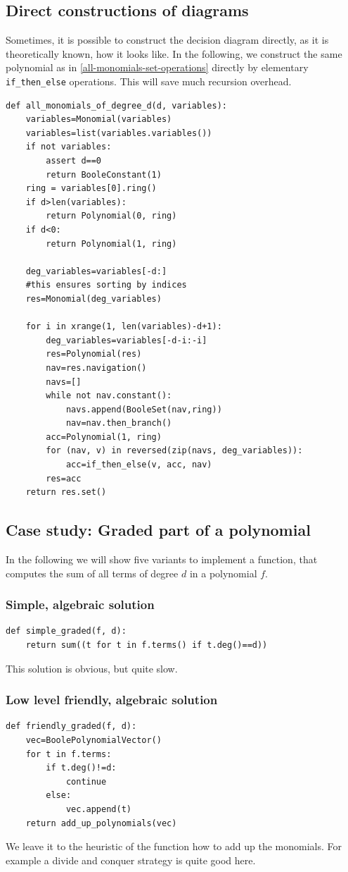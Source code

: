 \subsection{Direct constructions of diagrams}
Sometimes, it is possible to construct the decision diagram directly, as it is theoretically known, how it looks like.
In the following, we construct the same polynomial as in \ref{all-monomials-set-operations} directly by elementary \lstinline|if_then_else| operations. This will save much recursion overhead.
\begin{lstlisting}
def all_monomials_of_degree_d(d, variables):
    variables=Monomial(variables)
    variables=list(variables.variables())
    if not variables:
        assert d==0
        return BooleConstant(1)
    ring = variables[0].ring()
    if d>len(variables):
        return Polynomial(0, ring)
    if d<0:
        return Polynomial(1, ring)

    deg_variables=variables[-d:]
    #this ensures sorting by indices
    res=Monomial(deg_variables)

    for i in xrange(1, len(variables)-d+1):
        deg_variables=variables[-d-i:-i]
        res=Polynomial(res)
        nav=res.navigation()
        navs=[]
        while not nav.constant():
            navs.append(BooleSet(nav,ring))
            nav=nav.then_branch()
        acc=Polynomial(1, ring)
        for (nav, v) in reversed(zip(navs, deg_variables)):
            acc=if_then_else(v, acc, nav)
        res=acc
    return res.set()
\end{lstlisting}

\subsection{Case study: Graded part of a polynomial}
In the following we will show five variants to implement a function, that computes the sum of all terms of degree $d$ in a polynomial $f$.

\subsubsection{Simple, algebraic solution}
\begin{lstlisting}
def simple_graded(f, d):
    return sum((t for t in f.terms() if t.deg()==d))   
\end{lstlisting}
This solution is obvious, but quite slow.

\subsubsection{Low level friendly, algebraic solution}
\begin{lstlisting}
def friendly_graded(f, d):
    vec=BoolePolynomialVector()
    for t in f.terms:
        if t.deg()!=d:
            continue
        else:
            vec.append(t)
    return add_up_polynomials(vec)
\end{lstlisting}
We leave it to the heuristic of the  function how to add up the monomials. For example a divide and conquer strategy is quite good here.

